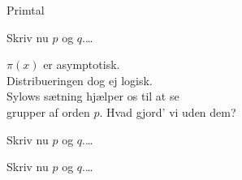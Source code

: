 \begin{song}{Primtal}
  \begin{SBChorus}
    Skriv nu $p$ og $q$.\ldots
  \end{SBChorus}

  \begin{SBVerse}
    $\pi(x)$ er asymptotisk.\\
    Distribueringen dog ej logisk.\\
    Sylows sætning hjælper os til at se\\
    grupper af orden $p$. Hvad gjord’ vi uden dem?\\
  \end{SBVerse}

  \begin{SBChorus}
    Skriv nu $p$ og $q$.\ldots
  \end{SBChorus}

  \begin{SBChorus}
    Skriv nu $p$ og $q$.\ldots
  \end{SBChorus}
\end{song}